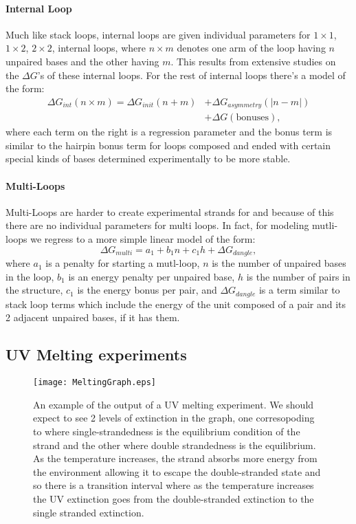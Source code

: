 \paragraph{Internal Loop}
Much like stack loops, internal loops are given individual parameters
for $1 \times 1$, $1 \times 2$, $2 \times 2$, internal loops, where $n
\times m$ denotes one arm of the loop having $n$ unpaired bases and
the other having $m$. This results from extensive studies on the
$\Delta G$'s of these internal loops. For the rest of internal loops
there's a model of the form:
\begin{equation}
\begin{split}
 \Delta G_{int} ( n \times m ) = \Delta G_{init} (n + m) &+ \Delta G_{asymmetry} (| n - m |) \\
& + \Delta G ( \text{bonuses}),
\end{split}
\end{equation}
where each term on the right is a regression parameter and the bonus
term is similar to the hairpin bonus term for loops composed and ended
with certain special kinds of bases determined experimentally to be
more stable.

\paragraph{Multi-Loops}
Multi-Loops are harder to create experimental strands for and because
of this there are no individual parameters for multi loops. In fact,
for modeling mutli-loops we regress to a more simple linear model of
the form:
\begin{equation}
\Delta G_{multi} = a_1 + b_1 n + c_1 h + \Delta G_{dangle},
\end{equation}
where $a_1$ is a penalty for starting a mutl-loop, $n$ is the number
of unpaired bases in the loop, $b_1$ is an energy penalty per unpaired
base, $h$ is the number of pairs in the structure, $c_1$ is the energy
bonus per pair, and $\Delta G_{dangle}$ is a term similar to stack
loop terms which include the energy of the unit composed of a pair and
its 2 adjacent unpaired bases, if it has them.


\subsection{UV Melting experiments}

\begin{figure}[h]
\centering
\texttt{[image: MeltingGraph.eps]}

\caption{An example of the output of a UV melting experiment. We
  should expect to see 2 levels of extinction in the graph, one
  corresopoding to where single-strandedness is the equilibrium
  condition of the strand and the other where double strandedness is
  the equilibrium. As the temperature increases, the strand absorbs
  more energy from the environment allowing it to escape the
  double-stranded state and so there is a transition interval where as
  the temperature increases the UV extinction goes from the
  double-stranded extinction to the single stranded extinction.}
\label{fig:UVMeltGraph}
\end{figure}

